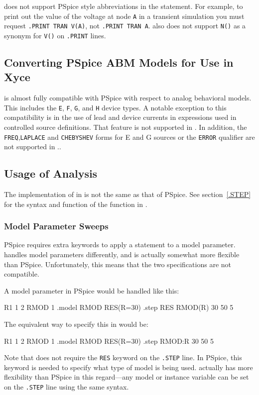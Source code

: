\Xyce{} does not support PSpice style abbreviations in the 
statement.  For example, to print out the value of the voltage at node
\texttt{A} in a transient simulation you must request \mbox{\texttt{.PRINT TRAN V(A)}},
not \mbox{\texttt{.PRINT TRAN A}}.  \Xyce{} also does not support \texttt{N()} as a
synonym for \texttt{V()} on \texttt{.PRINT} lines.

\subsection{Converting PSpice ABM Models for Use in Xyce}
\label{Converting_ABM}

\Xyce{} is almost fully compatible with PSpice with respect to analog
behavioral models.  This includes the
\texttt{E},
\texttt{F},
\texttt{G}, and
\texttt{H} 
device types.  A notable exception to this compatibility is in the use of lead and device
currents in expressions used in controlled source definitions.  That feature is not 
supported in \Xyce{}.  In addition, the \texttt{FREQ},\texttt{LAPLACE} and 
\texttt{CHEBYSHEV} forms for E and G sources or the \texttt{ERROR} qualifier are 
not supported in \Xyce{}..
  
\subsection{Usage of  Analysis}

The implementation of  in \Xyce{} is not the
same as that of PSpice.  See section~\ref{.STEP} for the syntax and
function of the  function in \Xyce{}.

\subsubsection{Model Parameter Sweeps}

PSpice requires extra keywords to apply a  statement to a
model parameter.  \Xyce{} handles model parameters differently, and is
actually somewhat more flexible than PSpice.  Unfortunately, this means
that the two specifications are not compatible.

A model parameter in PSpice would be handled like this:
\begin{vquote}
R1 1 2 RMOD 1
.model RMOD RES(R=30)
.step RES RMOD(R) 30 50 5
\end{vquote}
The equivalent way to specify this in \Xyce{} would be:
\begin{vquote}
R1 1 2 RMOD 1
.model RMOD RES(R=30)
.step RMOD:R 30 50 5
\end{vquote}
Note that \Xyce{} does not require the \texttt{RES} keyword on the
\texttt{.STEP} line.  In PSpice, this keyword is needed to specify 
what type of model is being used.  \Xyce{} actually has more flexibility
than PSpice in this regard---any model or instance variable can be set on
the \texttt{.STEP} line using the same syntax.

